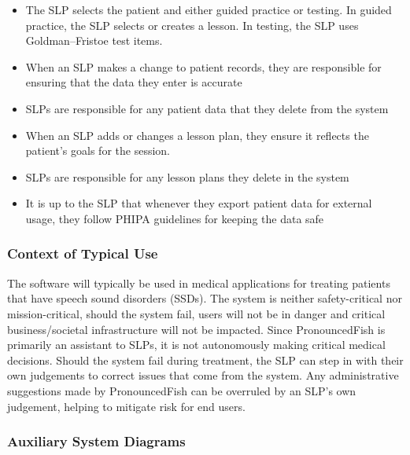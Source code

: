 \documentclass[12pt]{article}
\newcounter{presnum} %
\newcounter{slpresnum} %
\begin{document}
\begin{itemize}
\item[SLP-R\refstepcounter{slpresnum}\theslpresnum \label{Initiator of Sessions}:] The SLP selects the patient and either guided practice or testing. In guided practice, the SLP selects or creates a lesson. In testing, the SLP uses Goldman--Fristoe test items.
\item[SLP-R\refstepcounter{slpresnum}\theslpresnum \label{Changing Patient Records}:]When an SLP makes a change to patient records, they are responsible for ensuring that the data they enter is accurate
\item[SLP-R\refstepcounter{slpresnum}\theslpresnum \label{Deleting Patient Data}:]SLPs are responsible for any patient data that they delete from the system
\item[SLP-R\refstepcounter{slpresnum}\theslpresnum \label{Changing or Adding Lesson Plans}:]When an SLP adds or changes a lesson plan, they ensure it reflects the patient's goals for the session.
\item[SLP-R\refstepcounter{slpresnum}\theslpresnum \label{Deleting Lesson Plans}:]SLPs are responsible for any lesson plans they delete in the system
\item[SLP-R\refstepcounter{slpresnum}\theslpresnum \label{Patient Data Exporting}:]It is up to the SLP that whenever they export patient data for external usage, they follow PHIPA guidelines for keeping the data safe
\end{itemize}

\subsubsection{Context of Typical Use}

The software will typically be used in medical applications for treating patients that have speech sound disorders (SSDs). The system is neither safety-critical nor mission-critical, should the system fail, users will not be in danger and critical business/societal infrastructure will not be impacted. Since PronouncedFish is primarily an assistant to SLPs, it is not autonomously making critical medical decisions. Should the system fail during treatment, the SLP can step in with their own judgements to correct issues that come from the system. Any administrative suggestions made by PronouncedFish can be overruled by an SLP's own judgement, helping to mitigate risk for end users.

\subsubsection{Auxiliary System Diagrams}
\end{document}
